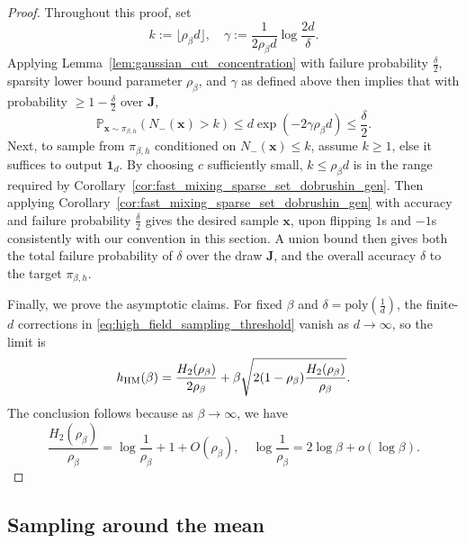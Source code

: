 \documentclass[11pt]{article}
\newcommand{\defeq}{:=}
\newcommand{\1}{\mathbf{1}}
\newcommand{\0}{\mathbf{0}}
\newcommand{\Par}[1]{\left(#1\right)}
\newcommand{\poly}{\mathrm{poly}}
\newcommand{\Prob}{\mathbb{P}}
\renewcommand{\Pr}{\Prob}
\newcommand{\mj}{{\mathbf{J}}}
\newcommand{\vx}{{\mathbf{x}}}
\begin{document}
\begin{proof}
Throughout this proof, set
\[k\defeq\lfloor\rho_\beta d\rfloor,\quad \gamma \defeq \frac 1 {2\rho_\beta d}\log \frac {2d} \delta.\] 
Applying
Lemma~\ref{lem:gaussian_cut_concentration} with failure probability
$\frac \delta 2$, sparsity lower bound parameter $\rho_\beta$, and $\gamma$ as defined above then implies that with probability $\ge 1 - \frac \delta 2$ over $\mj$, 
\begin{equation*}
    \Pr_{\vx \sim \pi_{\beta, h}}\Par{N_-(\vx) > k} \le d\exp(-2\gamma\rho_\beta d) \le \frac \delta 2.
\end{equation*}
Next, to sample from $\pi_{\beta, h}$ conditioned on $N_-(\vx) \le k$, assume $k \ge 1$, else it suffices to output $\1_d$. By choosing $c$ sufficiently small,
$k\le \rho_\beta d$ is in the range required by
Corollary~\ref{cor:fast_mixing_sparse_set_dobrushin_gen}. Then applying Corollary~\ref{cor:fast_mixing_sparse_set_dobrushin_gen} with
accuracy and failure probability $\frac \delta 2$ gives the desired sample $\vx$, upon flipping $1$s and $-1$s consistently with our convention in this section. A union bound then gives both the total failure probability of $\delta$ over the draw $\mj$, and the overall accuracy $\delta$ to the target $\pi_{\beta, h}$.

Finally, we prove the asymptotic claims.  For fixed $\beta$ and $\delta = \poly(\frac 1 d)$, the finite-$d$ corrections in \eqref{eq:high_field_sampling_threshold} vanish as $d\to\infty$, so the limit is
\begin{equation*}
    h_{\rm HM}(\beta)
    =
    \frac{H_2(\rho_\beta)}{2\rho_\beta}
    +
    \beta
    \sqrt{
        2(1-\rho_\beta)
        \frac{H_2(\rho_\beta)}{\rho_\beta}
    }.
\end{equation*}
The conclusion follows because as $\beta \to \infty$, we have 
\[
    \frac{H_2(\rho_\beta)}{\rho_\beta}
    =
    \log\frac1{\rho_\beta}
    +
    1
    +
    O(\rho_\beta),
    \quad
    \log\frac1{\rho_\beta}
    =
    2\log\beta+o(\log\beta).
\]
\end{proof}



\subsection{Sampling around the mean}
\label{ssec:oracle_centering}
\end{document}
